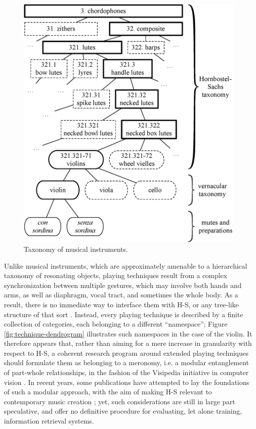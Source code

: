 \documentclass{article}
\makeatletter
\newcommand*{\ie}{i.e.\@\xspace}
\makeatother
\begin{document}
\begin{figure}[t!]
\centering
\includegraphics[width=\linewidth]{./figs/dendrograms/instrument-dendrogram.eps}
\caption{Taxonomy of musical instruments.}
\label{fig:instrument-dendrogram}
\end{figure}

Unlike musical instruments, which are approximately amenable to a hierarchical taxonomy of resonating objects, playing techniques result from a complex synchronization between multiple gestures, which may involve both hands and arms, as well as diaphragm, vocal tract, and sometimes the whole body.
As a result, there is no immediate way to interface them with H-S, or any tree-like structure of that sort \cite{kolozali2011ismir}.
Instead, every playing technique is described by a finite collection of categories, each belonging to a different ``namespace''; Figure \ref{fig:technique-dendrogram} illustrates such namespaces in the case of the violin.
It therefore appears that, rather than aiming for a mere increase in granularity with respect to H-S, a coherent research program around extended playing techniques should formulate them as belonging to a meronomy, \ie{} a modular entanglement of part-whole relationships, in the fashion of the Visipedia initiative in computer vision \cite{belongie2015pattern}.
In recent years, some publications have attempted to lay the foundations of such a modular approach, with the aim of making H-S relevant to contemporary music creation \cite{magnusson2017jnmr,weisser2011ytm} ; yet, such considerations are still in large part speculative, and offer no definitive procedure for evaluating, let alone training, information retrieval systems.
\end{document}
